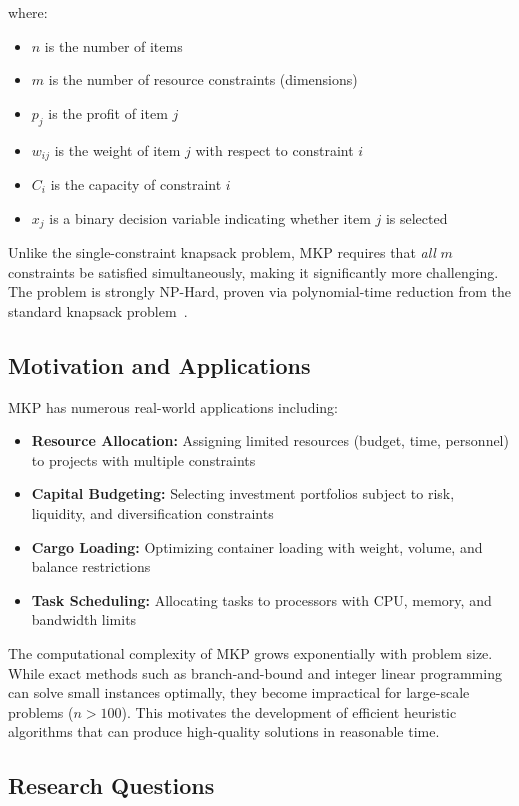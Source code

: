 \documentclass[12pt,a4paper]{article}
\begin{document}
where:
\begin{itemize}
    \item $n$ is the number of items
    \item $m$ is the number of resource constraints (dimensions)
    \item $p_j$ is the profit of item $j$
    \item $w_{ij}$ is the weight of item $j$ with respect to constraint $i$
    \item $C_i$ is the capacity of constraint $i$
    \item $x_j$ is a binary decision variable indicating whether item $j$ is selected
\end{itemize}

Unlike the single-constraint knapsack problem, MKP requires that \emph{all} $m$ constraints be satisfied simultaneously, making it significantly more challenging. The problem is strongly NP-Hard, proven via polynomial-time reduction from the standard knapsack problem~\cite{kellerer2004knapsack}.

\subsection{Motivation and Applications}

MKP has numerous real-world applications including:
\begin{itemize}
    \item \textbf{Resource Allocation:} Assigning limited resources (budget, time, personnel) to projects with multiple constraints
    \item \textbf{Capital Budgeting:} Selecting investment portfolios subject to risk, liquidity, and diversification constraints
    \item \textbf{Cargo Loading:} Optimizing container loading with weight, volume, and balance restrictions
    \item \textbf{Task Scheduling:} Allocating tasks to processors with CPU, memory, and bandwidth limits
\end{itemize}

The computational complexity of MKP grows exponentially with problem size. While exact methods such as branch-and-bound and integer linear programming can solve small instances optimally, they become impractical for large-scale problems ($n > 100$). This motivates the development of efficient heuristic algorithms that can produce high-quality solutions in reasonable time.

\subsection{Research Questions}
\end{document}
